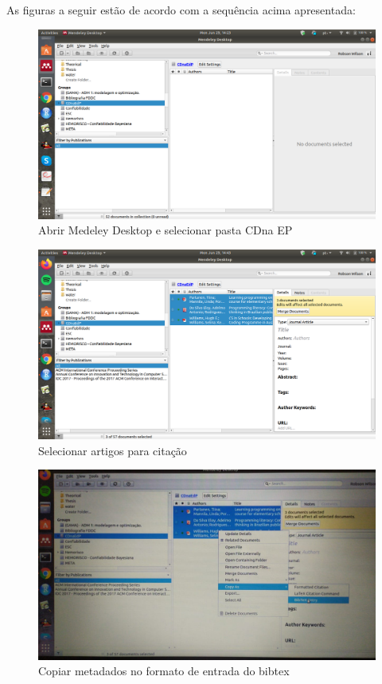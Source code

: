 \documentclass[
  oneside]{book}
\begin{document}
As figuras a seguir estão de acordo com a sequência acima apresentada:

\begin{figure}
\centering
\includegraphics{fig/open_mendeley.png}
\caption{Abrir Medeley Desktop e selecionar pasta CDna EP}
\end{figure}

\begin{figure}
\centering
\includegraphics{fig/mendeley_select_CDnaEP_paper_list.png}
\caption{Selecionar artigos para citação}
\end{figure}

\begin{figure}
\centering
\includegraphics{fig/mendeley_copy_bibtex_entry.jpeg}
\caption{Copiar metadados no formato de entrada do bibtex}
\end{figure}
\end{document}
